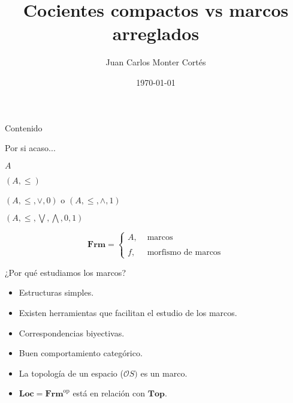 \documentclass[compress,12pt]{beamer}
\title{Cocientes compactos vs marcos arreglados}
\date{\today}
\author{Juan Carlos Monter Cortés}
\institute{Universidad de Guadalajara}
\DeclareMathOperator{\op}{op}
\begin{document}
\frame[plain]{\titlepage}

\begin{frame}{Contenido}
\tableofcontents %
\end{frame}

\begin{frame}{Por si acaso...}
    \begin{itemize}
        \begin{multicols}{2}
            \item $A$
            \item $(A, \leq)$
            \item $(A, \leq, \vee, 0)$ o $(A, \leq, \wedge, 1)$
            \item $(A, \leq, \bigvee, \bigwedge, 0, 1)$
        \end{multicols} 
        \end{itemize}
    
    
        \[
        \mathbf{Frm}=\left\{ \begin{array}{ll} A, & \mbox{ marcos}\\ \\  f, & \mbox{ morfismo de marcos} \end{array} \right.
        \]
\end{frame}

\begin{frame}{¿Por qué estudiamos los marcos?}
    \begin{itemize}
        \item Estructuras simples.
        \item<2-> Existen herramientas que facilitan el estudio de los marcos.
        \item<3-> Correspondencias biyectivas.
        \item<4-> Buen comportamiento categórico.
        \item<5-> \alert<7->{La topología de un espacio ($\mathcal{O}S)$ es un marco.}
        \item<6-> $\mathbf{Loc}=\mathbf{Frm}^{\op}$ está en relación con $\mathbf{Top}$.
    \end{itemize}
\end{frame}
\end{document}
